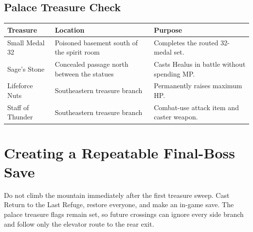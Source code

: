 \documentclass[
  american,
  10pt,
  letterpaper,
  oneside,
  open=any]{scrreprt}
\newcounter{none} %
\newenvironment{guidetable}{%
  \small\setstretch{1.0}%
  \setlength{\tabcolsep}{4pt}%
  \setlength{\LTpre}{8pt}\setlength{\LTpost}{10pt}%
  \renewcommand{\arraystretch}{1.16}%
}{ }
\begin{document}
\subsection{Palace Treasure Check}\label{palace-treasure-check}

\begin{guidetable}

{\def\LTcaptype{none} %
\begin{longtable}[]{@{}
  >{\raggedright\arraybackslash}p{}
  >{\raggedright\arraybackslash}p{}
  >{\raggedright\arraybackslash}p{}@{}}
\toprule\noalign{}
\begin{minipage}[b]{\linewidth}\raggedright
\color{GuideGreen}\bfseries Treasure
\end{minipage} & \begin{minipage}[b]{\linewidth}\raggedright
\color{GuideGreen}\bfseries Location
\end{minipage} & \begin{minipage}[b]{\linewidth}\raggedright
\color{GuideGreen}\bfseries Purpose
\end{minipage} \\
\midrule\noalign{}
\endhead
\bottomrule\noalign{}
\endlastfoot
Small Medal 32 & Poisoned basement south of the spirit room & Completes
the routed 32-medal set. \\
Sage's Stone & Concealed passage north between the statues & Casts
Healus in battle without spending MP. \\
Lifeforce Nuts & Southeastern treasure branch & Permanently raises
maximum HP. \\
Staff of Thunder & Southeastern treasure branch & Combat-use attack item
and caster weapon. \\
\end{longtable}
}

\end{guidetable}

\section{Creating a Repeatable Final-Boss
Save}\label{creating-a-repeatable-final-boss-save}

Do not climb the mountain immediately after the first treasure sweep.
Cast Return to the Last Refuge, restore everyone, and make an in-game
save. The palace treasure flags remain set, so future crossings can
ignore every side branch and follow only the elevator route to the rear
exit.
\end{document}

